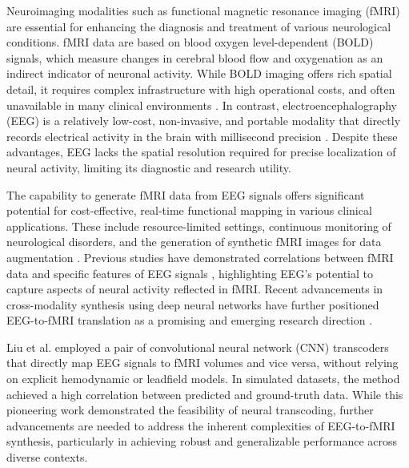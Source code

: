 
Neuroimaging modalities such as functional magnetic resonance imaging (fMRI) are essential for enhancing the diagnosis and treatment of various neurological conditions. 
fMRI data are based on blood oxygen level-dependent (BOLD) signals, which measure changes in cerebral blood flow and oxygenation as an indirect indicator of neuronal activity. 
While BOLD imaging offers rich spatial detail, it requires complex infrastructure with high operational costs, and often unavailable in many clinical environments \cite{constable2023challenges}. 
In contrast, electroencephalography (EEG) is a relatively low-cost, non-invasive, and portable modality that directly records electrical activity in the brain with millisecond precision \cite{sturzbecher2012simultaneous, debener2012taking}. 
Despite these advantages, EEG lacks the spatial resolution required for precise localization of neural activity, limiting its diagnostic and research utility. 

The capability to generate fMRI data from EEG signals offers significant potential for cost-effective, real-time functional mapping in various clinical applications. 
These include resource-limited settings, continuous monitoring of neurological disorders, and the generation of synthetic fMRI images for data augmentation \cite{zhuang2019fmri}. 
Previous studies have demonstrated correlations between fMRI data and specific features of EEG signals \cite{laufs2003eeg,laufs2006bold,chang2013eeg}, highlighting EEG's potential to capture aspects of neural activity reflected in fMRI. 
Recent advancements in cross-modality synthesis using deep neural networks have further positioned EEG-to-fMRI translation as a promising and emerging research direction \cite{liu2019convolutional, calhas2020eeg, calhas2022eeg, lanzino2024nt}. 

Liu et al. \cite{liu2019convolutional} employed a pair of convolutional neural network (CNN) transcoders that directly map EEG signals to fMRI volumes and vice versa, without relying on explicit hemodynamic or leadfield models. 
In simulated datasets, the method achieved a high correlation between predicted and ground-truth data. 
While this pioneering work demonstrated the feasibility of neural transcoding, further advancements are needed to address the inherent complexities of EEG-to-fMRI synthesis, particularly in achieving robust and generalizable performance across diverse contexts. 

